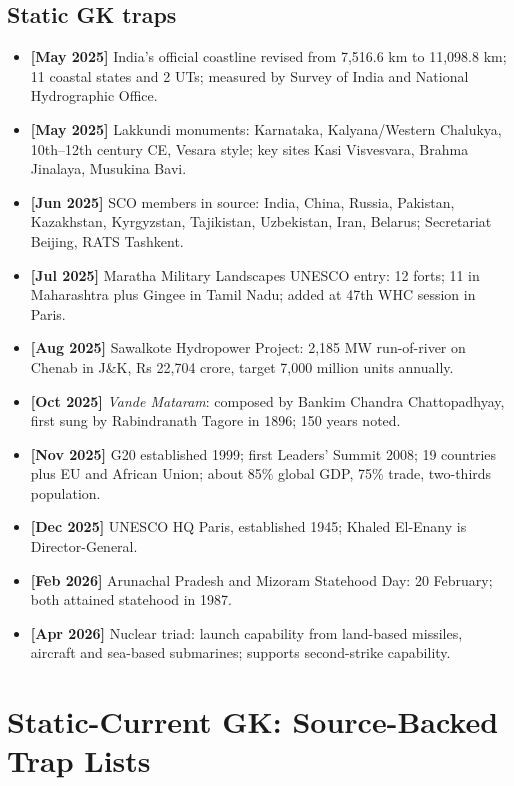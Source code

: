 \documentclass[10pt,a4paper]{article}
\newcommand{\monthtag}[1]{\textbf{[#1]}}
\newcommand{\fact}[2]{\item \monthtag{#1} #2}
\begin{document}
\subsection{Static GK traps}
\begin{itemize}
    \fact{May 2025}{India's official coastline revised from 7,516.6 km to 11,098.8 km; 11 coastal states and 2 UTs; measured by Survey of India and National Hydrographic Office.}
    \fact{May 2025}{Lakkundi monuments: Karnataka, Kalyana/Western Chalukya, 10th--12th century CE, Vesara style; key sites Kasi Visvesvara, Brahma Jinalaya, Musukina Bavi.}
    \fact{Jun 2025}{SCO members in source: India, China, Russia, Pakistan, Kazakhstan, Kyrgyzstan, Tajikistan, Uzbekistan, Iran, Belarus; Secretariat Beijing, RATS Tashkent.}
    \fact{Jul 2025}{Maratha Military Landscapes UNESCO entry: 12 forts; 11 in Maharashtra plus Gingee in Tamil Nadu; added at 47th WHC session in Paris.}
    \fact{Aug 2025}{Sawalkote Hydropower Project: 2,185 MW run-of-river on Chenab in J\&K, Rs 22,704 crore, target 7,000 million units annually.}
    \fact{Oct 2025}{\textit{Vande Mataram}: composed by Bankim Chandra Chattopadhyay, first sung by Rabindranath Tagore in 1896; 150 years noted.}
    \fact{Nov 2025}{G20 established 1999; first Leaders' Summit 2008; 19 countries plus EU and African Union; about 85\% global GDP, 75\% trade, two-thirds population.}
    \fact{Dec 2025}{UNESCO HQ Paris, established 1945; Khaled El-Enany is Director-General.}
    \fact{Feb 2026}{Arunachal Pradesh and Mizoram Statehood Day: 20 February; both attained statehood in 1987.}
    \fact{Apr 2026}{Nuclear triad: launch capability from land-based missiles, aircraft and sea-based submarines; supports second-strike capability.}
\end{itemize}

\section{Static-Current GK: Source-Backed Trap Lists}
\end{document}
